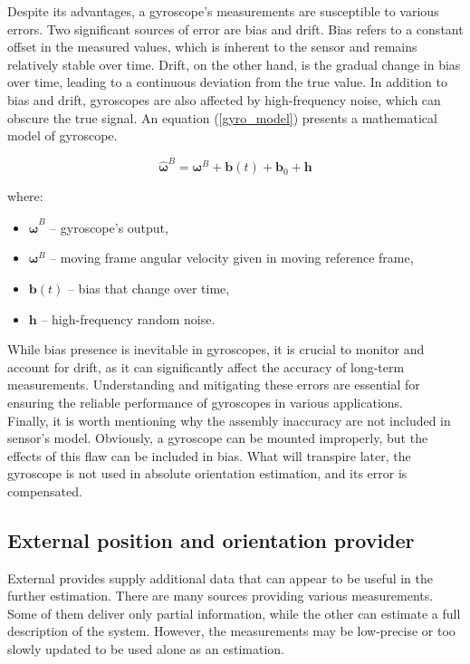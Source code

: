 Despite its advantages, a gyroscope's measurements are susceptible to various errors. Two significant sources of error are bias and drift. Bias refers to a constant offset in the measured values, which is inherent to the sensor and remains relatively stable over time. Drift, on the other hand, is the gradual change in bias over time, leading to a continuous deviation from the true value. In addition to bias and drift, gyroscopes are also affected by high-frequency noise, which can obscure the true signal. An equation (\ref{gyro_model}) presents a mathematical model of gyroscope.

\begin{equation}
	\bm{\hat{\omega}}^B = \bm{\omega}^B + \bm{b}(t) + \bm{b}_0 + \bm{h}
	\label{gyro_model}
\end{equation}

where:
\begin{itemize}
	\item $\bm{\hat{\omega}}^B$ -- gyroscope's output,
	\item $\bm{\omega}^B$ -- moving frame angular velocity given in moving reference frame,
	\item $\bm{b}(t)$ -- bias that change over time,
	\item $\bm{h}$ -- high-frequency random noise.
\end{itemize}

While bias presence is inevitable in gyroscopes, it is crucial to monitor and account for drift, as it can significantly affect the accuracy of long-term measurements. Understanding and mitigating these errors are essential for ensuring the reliable performance of gyroscopes in various applications.\\

Finally, it is worth mentioning why the assembly inaccuracy are not included in sensor's model. Obviously, a gyroscope can be mounted improperly, but the effects of this flaw can be included in bias. What will transpire later, the gyroscope is not used in absolute orientation estimation, and its error is compensated.

\subsection{External position and orientation provider}

External provides supply additional data that can appear to be useful in the further estimation. There are many sources providing various measurements. Some of them deliver only partial information, while the other can estimate a full description of the system. However, the measurements may be low-precise or too slowly updated to be used alone as an estimation.\\


